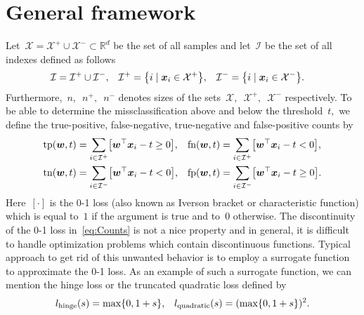 \documentclass[11pt,a4paper]{article}
\theoremstyle{definition}
\let\originalleft\left
\let\originalright\right
\renewcommand{\left}{\mathopen{}\mathclose\bgroup\originalleft}
\renewcommand{\right}{\aftergroup\egroup\originalright}
\newcommand{\R}{\mathbb{R}}
\newcommand{\X}{\mathcal{X}}
\newcommand{\I}{\mathcal{I}}
\newcommand{\tp}{\textnormal{tp}}
\newcommand{\tn}{\textnormal{tn}}
\newcommand{\fp}{\textnormal{fp}}
\newcommand{\fn}{\textnormal{fn}}
\begin{document}
\section{General framework}\label{sec:General framework}

Let~$\X = \X^+ \cup \X^- \subset \R^d$ be the set of all samples and let~$\I$ be the set of all indexes defined as follows
\begin{equation*}
  \begin{aligned}
    \I   & = \I^+ \cup \I^-, &
    \I^+ & = \left\{i \mid \bm{x}_i \in \X^+ \right\}, &
    \I^- & = \left\{i \mid \bm{x}_i \in \X^- \right\}. 
  \end{aligned}
\end{equation*} 
Furthermore,~$n,$~$n^+,$~$n^-$ denotes sizes of the sets~$\X,$~$\X^+,$~$\X^-$ respectively. To be able to determine the missclassification above and below the threshold~$t,$ we define the true-positive, false-negative, true-negative and false-positive counts by
\begin{equation}\label{eq:Counts}
  \begin{aligned}
    \tp(\bm{w},t) & = \sum_{i \in \I^+} \left[\bm{w}^\top \bm{x}_i - t \ge 0 \right], &
    \fn(\bm{w},t) & = \sum_{i \in \I^+} \left[\bm{w}^\top \bm{x}_i - t <   0 \right], \\
    \tn(\bm{w},t) & = \sum_{i \in \I^-} \left[\bm{w}^\top \bm{x}_i - t <   0 \right], &
    \fp(\bm{w},t) & = \sum_{i \in \I^-} \left[\bm{w}^\top \bm{x}_i - t \ge 0 \right].
  \end{aligned}
\end{equation}
Here~$[\cdot]$ is the 0-1 loss (also known as Iverson bracket or characteristic function) which is equal to~$1$ if the argument is true and to~$0$ otherwise. The discontinuity of the 0-1 loss in~\eqref{eq:Counts} is not a nice property and in general, it is difficult to handle optimization problems which contain discontinuous functions. Typical approach to get rid of this unwanted behavior is to employ a surrogate function to approximate the 0-1 loss. As an example of such a surrogate function, we can mention the hinge loss or the truncated quadratic loss defined by
\begin{equation*}\label{eq:Surrogates}
  \begin{aligned}
    l_{\rm hinge} \left(s\right)     & = \max \{0, 1 + s\}, &
    l_{\rm quadratic} \left(s\right) & = ( \max \{0, 1 + s\})^2. \\
  \end{aligned}
\end{equation*}
\end{document}
